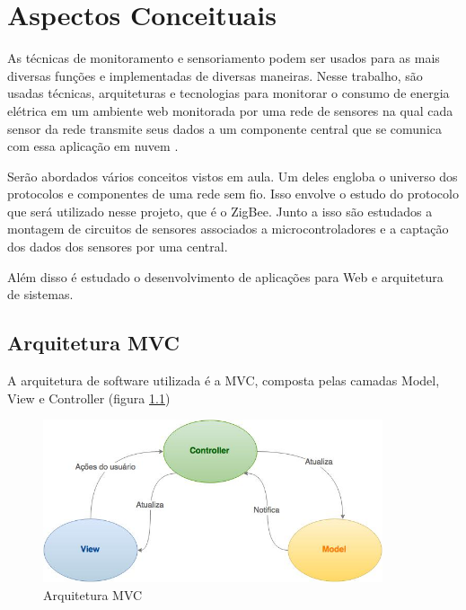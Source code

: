 \chapter{Aspectos Conceituais}
\label{Cap:conceitos}

As técnicas de monitoramento e sensoriamento podem ser usados para as mais diversas funções e implementadas de diversas maneiras. Nesse trabalho, são usadas técnicas, arquiteturas e tecnologias para monitorar o consumo de energia elétrica em um ambiente web monitorada por uma rede de sensores na qual cada sensor da rede transmite seus dados a um componente central que se comunica com essa aplicação em nuvem  \cite{low_cost_wireless_sensor_network_SMF_master_thesis} .

Serão abordados vários conceitos vistos em aula. Um deles engloba o universo dos protocolos e componentes de uma rede sem fio. Isso envolve o estudo do protocolo que será utilizado nesse projeto, que é o ZigBee. Junto a isso são estudados a montagem de circuitos de sensores associados a microcontroladores e a captação dos dados dos sensores por uma central.

Além disso é estudado o desenvolvimento de aplicações para Web e arquitetura de sistemas.




\section{Arquitetura MVC }
\label{Sec:MVC}

A arquitetura de software utilizada é a MVC, composta pelas camadas Model, View e Controller (figura \ref{fig:mvc})

\begin{figure}
\centering
\includegraphics[width=10cm,keepaspectratio]{figuras/MVC.jpg}
\caption{\label{fig:mvc} Arquitetura MVC}
\end{figure}

